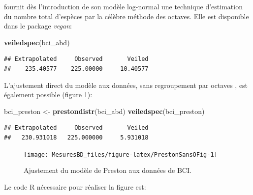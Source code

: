 \documentclass[
  11pt,
  american,
  a4paper,
  extrafontsizes,onecolumn,openright
  ]{memoir}
\newenvironment{Shaded}{\begin{snugshade}}{\end{snugshade}}
\newcommand{\FunctionTok}[1]{\textcolor[rgb]{0.13,0.29,0.53}{\textbf{#1}}}
\newcommand{\NormalTok}[1]{#1}
\newcommand{\OtherTok}[1]{\textcolor[rgb]{0.56,0.35,0.01}{#1}}
\begin{document}
\textcite{Preston1948} fournit dès l'introduction de son modèle log-normal une technique d'estimation du nombre total d'espèces par la célèbre méthode des octaves.
Elle est disponible dans le package \emph{vegan}:

\scriptsize

\begin{Shaded}
\begin{Highlighting}[]
\FunctionTok{veiledspec}\NormalTok{(bci\_abd)}
\end{Highlighting}
\end{Shaded}

\begin{verbatim}
## Extrapolated     Observed       Veiled 
##    235.40577    225.00000     10.40577
\end{verbatim}

\normalsize

L'ajustement direct du modèle aux données, sans regroupement par octaves \autocite{Williamson2005}, est également possible (figure \ref{fig:PrestonSansOFig}):

\scriptsize

\begin{Shaded}
\begin{Highlighting}[]
\NormalTok{bci\_preston }\OtherTok{\textless{}{-}} \FunctionTok{prestondistr}\NormalTok{(bci\_abd)}
\FunctionTok{veiledspec}\NormalTok{(bci\_preston)}
\end{Highlighting}
\end{Shaded}

\begin{verbatim}
## Extrapolated     Observed       Veiled 
##   230.931018   225.000000     5.931018
\end{verbatim}

\normalsize



\scriptsize

\begin{figure}

{\centering \texttt{[image: MesuresBD\_files/figure-latex/PrestonSansOFig-1]} 

}

\caption{Ajustement du modèle de Preston aux données de BCI.}\label{fig:PrestonSansOFig}
\end{figure}

\normalsize

Le code R nécessaire pour réaliser la figure est:

\scriptsize
\end{document}
